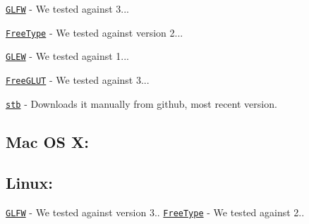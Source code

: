 \href{https://github.com/glfw/glfw/releases/download/3.1.1/glfw-3.1.1.zip}{\tt G\+L\+F\+W} -\/ We tested against 3...

\href{http://downloads.sourceforge.net/project/gnuwin32/freetype/2.3.5-1/freetype-2.3.5-1-bin.zip}{\tt Free\+Type} -\/ We tested against version 2...

\href{http://downloads.sourceforge.net/project/glew/glew/1.12.0/glew-1.12.0.zip}{\tt G\+L\+E\+W} -\/ We tested against 1...

\href{http://downloads.sourceforge.net/project/freeglut/freeglut/3.0.0/freeglut-3.0.0.tar.gz}{\tt Free\+G\+L\+U\+T} -\/ We tested against 3...

\href{https://github.com/nothings/stb/archive/master.zip}{\tt stb} -\/ Downloads it manually from github, most recent version.

\subsection*{Mac O\+S X\+:}

\subsection*{Linux\+:}

\href{http://www.glfw.org/download.html}{\tt G\+L\+F\+W} -\/ We tested against version 3.. \href{http://www.freetype.org/download.html}{\tt Free\+Type} -\/ We tested against 2.. 